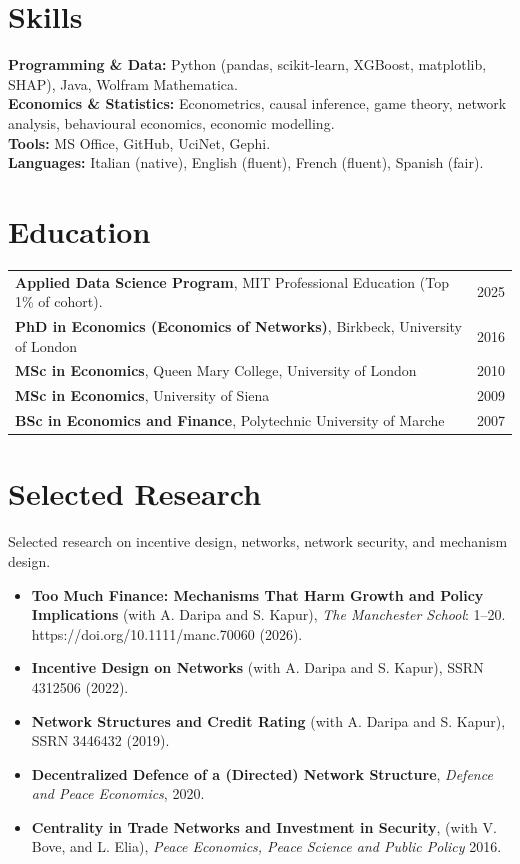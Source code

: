 \documentclass[11pt,a4paper]{article}
\begin{document}
\newpage

\section{Skills}
\textbf{Programming \& Data:} Python (pandas, scikit-learn, XGBoost, matplotlib, SHAP), Java, Wolfram Mathematica. \\
\textbf{Economics \& Statistics:} Econometrics, causal inference, game theory, network analysis, behavioural economics, economic modelling. \\
\textbf{Tools:} MS Office, GitHub, UciNet, Gephi. \\
\textbf{Languages:} Italian (native), English (fluent), French (fluent), Spanish (fair).

\section{Education}
\begin{tabular*}{\textwidth}{@{}l@{\extracolsep{\fill}}r@{}}
\textbf{Applied Data Science Program}, MIT Professional Education (Top 1\% of cohort). & 2025 \\
\textbf{PhD in Economics (Economics of Networks)}, Birkbeck, University of London & 2016 \\
\textbf{MSc in Economics}, Queen Mary College, University of London & 2010 \\
\textbf{MSc in Economics}, University of Siena & 2009 \\
\textbf{BSc in Economics and Finance}, Polytechnic University of Marche & 2007 \\
\end{tabular*}

\section{Selected Research}
Selected research on incentive design, networks, network security, and mechanism design.
\begin{itemize}[noitemsep, topsep=2pt]
\item \textbf{Too Much Finance: Mechanisms That Harm Growth and Policy Implications} (with A. Daripa and S. Kapur), \textit{The Manchester School}: 1–20. https://doi.org/10.1111/manc.70060 (2026).
    \item \textbf{Incentive Design on Networks} (with A. Daripa and S. Kapur), SSRN 4312506 (2022).
    \item \textbf{Network Structures and Credit Rating} (with A. Daripa and S. Kapur), SSRN 3446432 (2019).
    \item \textbf{Decentralized Defence of a (Directed) Network Structure}, \textit{Defence and Peace Economics}, 2020.
    \item \textbf{Centrality in Trade Networks and Investment in Security}, (with V. Bove, and L. Elia), \textit{Peace Economics, Peace Science and Public Policy} 2016.
\end{itemize}
\end{document}

